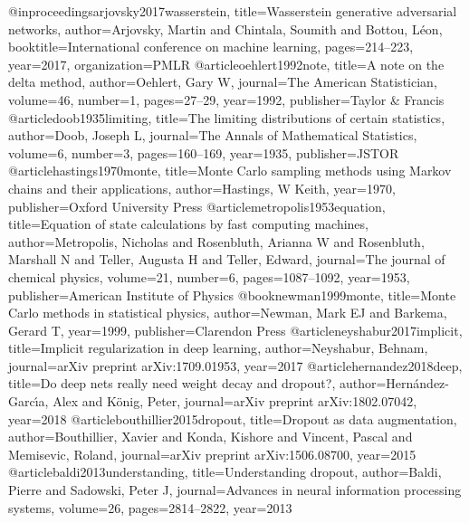 \documentclass[nohyperref]{article}
\theoremstyle{plain}
\theoremstyle{definition}
\theoremstyle{remark}
\begin{document}
@inproceedings{arjovsky2017wasserstein,
  title={Wasserstein generative adversarial networks},
  author={Arjovsky, Martin and Chintala, Soumith and Bottou, L{\'e}on},
  booktitle={International conference on machine learning},
  pages={214--223},
  year={2017},
  organization={PMLR}
}
@article{oehlert1992note,
  title={A note on the delta method},
  author={Oehlert, Gary W},
  journal={The American Statistician},
  volume={46},
  number={1},
  pages={27--29},
  year={1992},
  publisher={Taylor \& Francis}
}
@article{doob1935limiting,
  title={The limiting distributions of certain statistics},
  author={Doob, Joseph L},
  journal={The Annals of Mathematical Statistics},
  volume={6},
  number={3},
  pages={160--169},
  year={1935},
  publisher={JSTOR}
}
@article{hastings1970monte,
  title={Monte Carlo sampling methods using Markov chains and their applications},
  author={Hastings, W Keith},
  year={1970},
  publisher={Oxford University Press}
}
@article{metropolis1953equation,
  title={Equation of state calculations by fast computing machines},
  author={Metropolis, Nicholas and Rosenbluth, Arianna W and Rosenbluth, Marshall N and Teller, Augusta H and Teller, Edward},
  journal={The journal of chemical physics},
  volume={21},
  number={6},
  pages={1087--1092},
  year={1953},
  publisher={American Institute of Physics}
}
@book{newman1999monte,
  title={Monte Carlo methods in statistical physics},
  author={Newman, Mark EJ and Barkema, Gerard T},
  year={1999},
  publisher={Clarendon Press}
}
@article{neyshabur2017implicit,
  title={Implicit regularization in deep learning},
  author={Neyshabur, Behnam},
  journal={arXiv preprint arXiv:1709.01953},
  year={2017}
}
@article{hernandez2018deep,
  title={Do deep nets really need weight decay and dropout?},
  author={Hern{\'a}ndez-Garc{\'\i}a, Alex and K{\"o}nig, Peter},
  journal={arXiv preprint arXiv:1802.07042},
  year={2018}
}
@article{bouthillier2015dropout,
  title={Dropout as data augmentation},
  author={Bouthillier, Xavier and Konda, Kishore and Vincent, Pascal and Memisevic, Roland},
  journal={arXiv preprint arXiv:1506.08700},
  year={2015}
}
@article{baldi2013understanding,
  title={Understanding dropout},
  author={Baldi, Pierre and Sadowski, Peter J},
  journal={Advances in neural information processing systems},
  volume={26},
  pages={2814--2822},
  year={2013}
}
\end{document}
